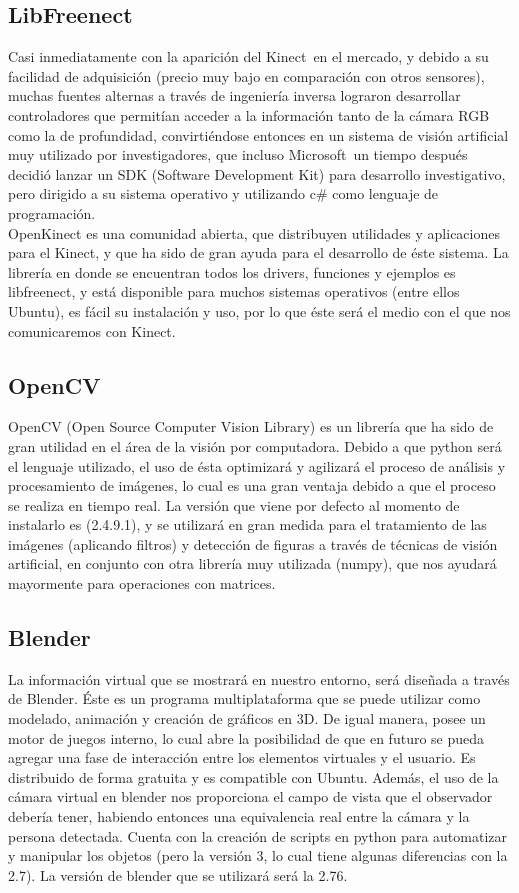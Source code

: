 \documentclass[a4paper,openright,12pt]{report}
\begin{document}
\subsection{LibFreenect}
Casi inmediatamente con la aparición del Kinect\textcopyright\ en el mercado, y debido a su facilidad de adquisición (precio muy bajo en comparación con otros sensores), muchas fuentes alternas a través de ingeniería inversa lograron desarrollar controladores que permitían acceder a la información tanto de la cámara RGB como la de profundidad, convirtiéndose entonces en un sistema de visión artificial muy utilizado por investigadores, que incluso Microsoft\textregistered\ un tiempo después decidió lanzar un SDK (Software Development Kit) para desarrollo investigativo, pero dirigido a su sistema operativo y utilizando c\# como lenguaje de programación.\\
OpenKinect es una comunidad abierta, que distribuyen utilidades y aplicaciones para el Kinect\textcopyright, y que ha sido de gran ayuda para el desarrollo de éste sistema. La librería en donde se encuentran todos los drivers, funciones y ejemplos es libfreenect, y está disponible para muchos sistemas operativos (entre ellos Ubuntu), es fácil su instalación y uso, por lo que éste será el medio con el que nos comunicaremos con Kinect\textcopyright.
\subsection{OpenCV}
OpenCV (Open Source Computer Vision Library) es un librería que ha sido de gran utilidad en el área de la visión por computadora. Debido a que python será el lenguaje utilizado, el uso de ésta optimizará y agilizará el proceso de análisis y procesamiento de imágenes, lo cual es una gran ventaja debido a que el proceso se realiza en tiempo real. La versión que viene por defecto al momento de instalarlo es (2.4.9.1), y se utilizará en gran medida para el tratamiento de las imágenes (aplicando filtros) y detección de figuras a través de técnicas de visión artificial, en conjunto con otra librería muy utilizada (numpy), que nos ayudará mayormente para operaciones con matrices.
\subsection{Blender}
La información virtual que se mostrará en nuestro entorno, será diseñada a través de Blender\textcopyright. Éste es un programa multiplataforma que se puede utilizar como modelado, animación y creación de gráficos en 3D. De igual manera, posee un motor de juegos interno, lo cual abre la posibilidad de que en futuro se pueda agregar una fase de interacción entre los elementos virtuales y el usuario. Es distribuido de forma gratuita y es compatible con Ubuntu. Además, el uso de la cámara virtual en blender nos proporciona el campo de vista que el observador debería tener, habiendo entonces una equivalencia real entre la cámara y la persona detectada. Cuenta con la creación de scripts en python para automatizar y manipular los objetos (pero la versión 3, lo cual tiene algunas diferencias con la 2.7). La versión de blender que se utilizará será la 2.76.
\end{document}
